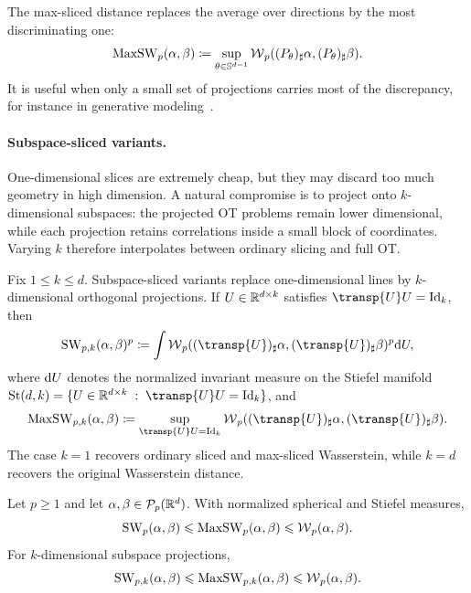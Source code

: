 \begin{defn}\label{def-sliced-variants}
	The max-sliced distance replaces the average over directions by the most discriminating one:
	\[
		\operatorname{MaxSW}_p(\alpha,\beta)
		\coloneqq
		\sup_{\theta\in\mathbb{S}^{d-1}}
		\operatorname{\mathcal{W}}_p((P_\theta)_\sharp\alpha,(P_\theta)_\sharp\beta).
	\]
	It is useful when only a small set of projections carries most of the discrepancy, for instance in generative modeling~\cite{deshpande2019maxsliced}.
\end{defn}

\paragraph{Subspace-sliced variants.}

One-dimensional slices are extremely cheap, but they may discard too much geometry in high dimension. A natural compromise is to project onto $k$-dimensional subspaces: the projected OT problems remain lower dimensional, while each projection retains correlations inside a small block of coordinates. Varying $k$ therefore interpolates between ordinary slicing and full OT.

\begin{defn}\label{def-subspace-sliced-wasserstein}
	Fix $1\leq k\leq d$. Subspace-sliced variants replace one-dimensional lines by $k$-dimensional orthogonal projections. If $U\in\mathbb{R}^{d\times k}$ satisfies $\transp{U}U=\Id_k$, then
	\[
		\SW_{p,k}(\alpha,\beta)^p
		\eqdef
		\int \Wass_p((\transp{U})_\sharp\alpha,(\transp{U})_\sharp\beta)^p\d U,
	\]
	where $\mathrm{d} U$ denotes the normalized invariant measure on the Stiefel manifold
	$\mathrm{St}(d,k)=\{U\in\RR^{d\times k}\;:\;\transp{U}U=\Id_k\}$, and
	\[
		\MaxSW_{p,k}(\alpha,\beta)
		\eqdef
		\sup_{\transp{U}U=\Id_k}
		\Wass_p((\transp{U})_\sharp\alpha,(\transp{U})_\sharp\beta).
	\]
	The case $k=1$ recovers ordinary sliced and max-sliced Wasserstein, while $k=d$ recovers the original Wasserstein distance.
\end{defn}

\begin{prop}\label{prop-sliced-variant-bounds}
	Let $p\geq1$ and let $\alpha,\beta\in\mathcal{P}_p(\mathbb{R}^d)$. With normalized spherical and Stiefel measures,
	\[
		\operatorname{SW}_p(\alpha,\beta)
		\leqslant
		\operatorname{MaxSW}_p(\alpha,\beta)
		\leqslant
		\operatorname{\mathcal{W}}_p(\alpha,\beta).
	\]
	For $k$-dimensional subspace projections,
	\[
		\operatorname{SW}_{p,k}(\alpha,\beta)
		\leqslant
		\operatorname{MaxSW}_{p,k}(\alpha,\beta)
		\leqslant
		\operatorname{\mathcal{W}}_p(\alpha,\beta).
	\]
\end{prop}

